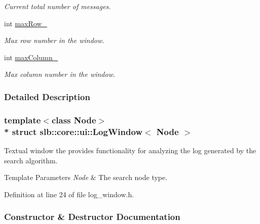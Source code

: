 \begin{DoxyCompactItemize}
\begin{DoxyCompactList}\small\item\em Current total number of messages. \end{DoxyCompactList}\item 
int \hyperlink{structslb_1_1core_1_1ui_1_1LogWindow_ad48a100b4ecc41acec8ad4316f982659}{max\+Row\+\_\+}\hypertarget{structslb_1_1core_1_1ui_1_1LogWindow_ad48a100b4ecc41acec8ad4316f982659}{}\label{structslb_1_1core_1_1ui_1_1LogWindow_ad48a100b4ecc41acec8ad4316f982659}

\begin{DoxyCompactList}\small\item\em Max row number in the window. \end{DoxyCompactList}\item 
int \hyperlink{structslb_1_1core_1_1ui_1_1LogWindow_a2cb275cd0d3bdb43697f993d5c690414}{max\+Column\+\_\+}\hypertarget{structslb_1_1core_1_1ui_1_1LogWindow_a2cb275cd0d3bdb43697f993d5c690414}{}\label{structslb_1_1core_1_1ui_1_1LogWindow_a2cb275cd0d3bdb43697f993d5c690414}

\begin{DoxyCompactList}\small\item\em Max column number in the window. \end{DoxyCompactList}\end{DoxyCompactItemize}


\subsubsection{Detailed Description}
\subsubsection*{template$<$class Node$>$\\*
struct slb\+::core\+::ui\+::\+Log\+Window$<$ Node $>$}

Textual window the provides functionality for analyzing the log generated by the search algorithm. 


\begin{DoxyTemplParams}{Template Parameters}
{\em Node} & The search node type. \\
\hline
\end{DoxyTemplParams}


Definition at line 24 of file log\+\_\+window.\+h.



\subsubsection{Constructor \& Destructor Documentation}
